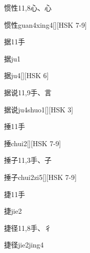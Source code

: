 \begin{Entry}{惯性}{11,8}{⼼、⼼}
  \begin{Phonetics}{惯性}{guan4xing4}[][HSK 7-9]
  \end{Phonetics}
\end{Entry}

\begin{Entry}{据}{11}{⼿}
  \begin{Phonetics}{据}{ju1}
  \end{Phonetics}
  \begin{Phonetics}{据}{ju4}[][HSK 6]
  \end{Phonetics}
\end{Entry}

\begin{Entry}{据说}{11,9}{⼿、⾔}
  \begin{Phonetics}{据说}{ju4shuo1}[][HSK 3]
  \end{Phonetics}
\end{Entry}

\begin{Entry}{捶}{11}{⼿}
  \begin{Phonetics}{捶}{chui2}[][HSK 7-9]
  \end{Phonetics}
\end{Entry}

\begin{Entry}{捶子}{11,3}{⼿、⼦}
  \begin{Phonetics}{捶子}{chui2zi5}[][HSK 7-9]
  \end{Phonetics}
\end{Entry}

\begin{Entry}{捷}{11}{⼿}
  \begin{Phonetics}{捷}{jie2}
  \end{Phonetics}
\end{Entry}

\begin{Entry}{捷径}{11,8}{⼿、⼻}
  \begin{Phonetics}{捷径}{jie2jing4}
  \end{Phonetics}
\end{Entry}

